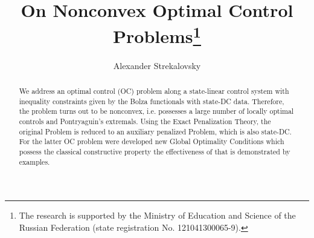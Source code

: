 \documentclass[12pt]{llncs}
\begin{document}
%

\fi

\title{On Nonconvex Optimal Control Problems\thanks{The research is supported by the Ministry of Education and Science of the Russian Federation (state registration No. 121041300065-9).}}
\author{Alexander Strekalovsky}


\maketitle

\begin{abstract}
We address an optimal control (OC) problem along a state-linear control system  with inequality constraints given by the Bolza functionals with state-DC data. Therefore, the problem turns out to be nonconvex, i.e. possesses a large number of locally optimal controls and Pontryaguin's extremals. 
Using the Exact Penalization Theory, the original Problem is reduced to an auxiliary penalized Problem, which is also state-DC. 
For the latter OC problem were developed new Global Optimality Conditions which possess the classical constructive property the effectiveness of that is demonstrated by examples. 

\end{abstract}
\end{document}
